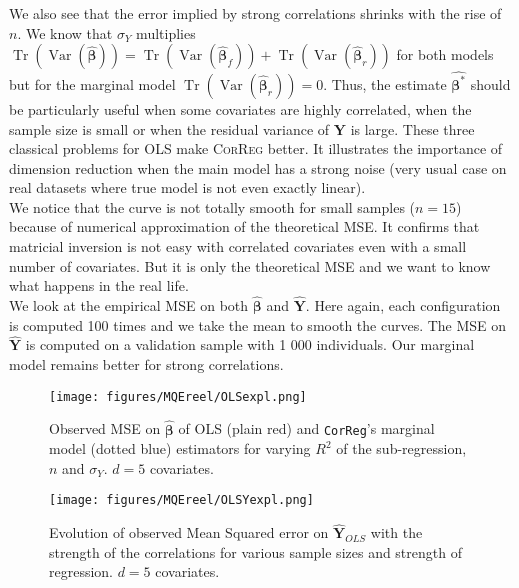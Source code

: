 \documentclass[12pt,a4paper]{report}
\begin{document}
 We also see that the error implied by strong correlations shrinks with the rise of $n$. 
We know that $\sigma_Y$ multiplies $\operatorname{Tr}(\operatorname{Var}(\hat{\boldsymbol{\beta}}))=\operatorname{Tr}(\operatorname{Var}(\hat{\boldsymbol{\beta}}_{f}))+\operatorname{Tr}(\operatorname{Var}(\hat{\boldsymbol{\beta}}_{r}))$ for both models but for the marginal model $\operatorname{Tr}(\operatorname{Var}(\hat{\boldsymbol{\beta}}_{r}))=0$. 
	Thus, the estimate $\hat{\boldsymbol{\beta}^*}$ should be particularly useful when some covariates are highly correlated, when the sample size is small or when the residual variance of $\boldsymbol{Y}$ is large. These three classical problems for OLS make \textsc{CorReg} better. It illustrates the importance of dimension reduction when the main model has a strong noise (very usual case on real datasets where true model is not even exactly linear). \\
	
	We notice that the curve is not totally smooth for small samples ($n=15$) because of numerical approximation of the theoretical MSE. It confirms that matricial inversion is not easy with correlated covariates even with a small number of covariates. But it is only the theoretical MSE and we want to know what happens in the real life. \\



We look at the empirical MSE on both $\hat{\boldsymbol{\beta}}$ and $\hat{\boldsymbol{Y}}$. Here again, each configuration is computed 100 times and we take the mean to smooth the curves. The MSE on $\hat{\boldsymbol{Y}}$ is computed on a validation sample with 1 000 individuals. Our marginal model remains better for strong correlations.\\

	
 \begin{figure}[h!]
	\texttt{[image: figures/MQEreel/OLSexpl.png]}
	\caption{Observed MSE on $\hat{\boldsymbol{\beta}}$ of OLS (plain red) and {\tt CorReg}'s marginal model (dotted blue) estimators for varying $R^2$ of the sub-regression, $n$ and $\sigma_Y$. $d=5$ covariates.}\label{MSEOLSexpl}
\end{figure} 
	
	 \begin{figure}
	 \centering
	  \texttt{[image: figures/MQEreel/OLSYexpl.png]}
	  \caption{Evolution of observed Mean Squared error on $\hat{\boldsymbol{Y}}_{OLS}$ with the strength of the correlations for various sample sizes and strength of regression. $d=5$ covariates. } \label{MQEOLSYexpl}
	\end{figure}
\end{document}
